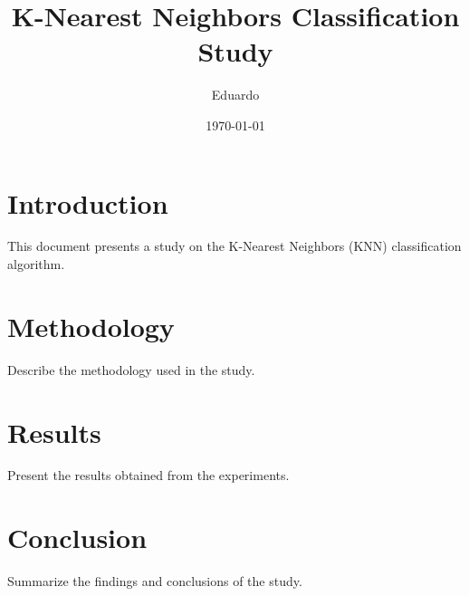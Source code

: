 \documentclass[a4paper,12pt]{article}
\title{K-Nearest Neighbors Classification Study}
\author{Eduardo}
\date{\today}
\begin{document}
\maketitle

\section{Introduction}
This document presents a study on the K-Nearest Neighbors (KNN) classification algorithm.

\section{Methodology}
Describe the methodology used in the study.

\section{Results}
Present the results obtained from the experiments.



\section{Conclusion}
Summarize the findings and conclusions of the study.
\end{document}
